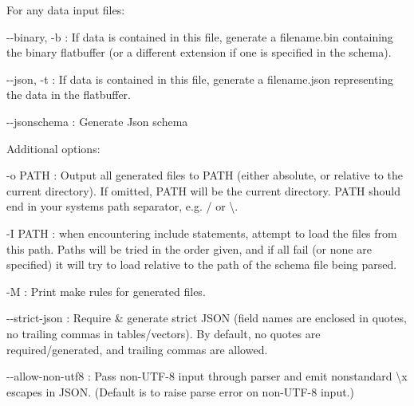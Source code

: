 For any data input files\+:


\begin{DoxyItemize}
\item {\ttfamily -\/-\/binary}, {\ttfamily -\/b} \+: If data is contained in this file, generate a {\ttfamily filename.\+bin} containing the binary flatbuffer (or a different extension if one is specified in the schema).
\item {\ttfamily -\/-\/json}, {\ttfamily -\/t} \+: If data is contained in this file, generate a {\ttfamily filename.\+json} representing the data in the flatbuffer.
\item {\ttfamily -\/-\/jsonschema} \+: Generate Json schema
\end{DoxyItemize}

Additional options\+:


\begin{DoxyItemize}
\item {\ttfamily -\/o PATH} \+: Output all generated files to PATH (either absolute, or relative to the current directory). If omitted, PATH will be the current directory. PATH should end in your systems path separator, e.\+g. {\ttfamily /} or {\ttfamily \textbackslash{}}.
\item {\ttfamily -\/I PATH} \+: when encountering {\ttfamily include} statements, attempt to load the files from this path. Paths will be tried in the order given, and if all fail (or none are specified) it will try to load relative to the path of the schema file being parsed.
\item {\ttfamily -\/M} \+: Print make rules for generated files.
\item {\ttfamily -\/-\/strict-\/json} \+: Require \& generate strict JSON (field names are enclosed in quotes, no trailing commas in tables/vectors). By default, no quotes are required/generated, and trailing commas are allowed.
\item {\ttfamily -\/-\/allow-\/non-\/utf8} \+: Pass non-\/\+UTF-\/8 input through parser and emit nonstandard \textbackslash{}x escapes in JSON. (Default is to raise parse error on non-\/\+UTF-\/8 input.)

\end{DoxyItemize}
